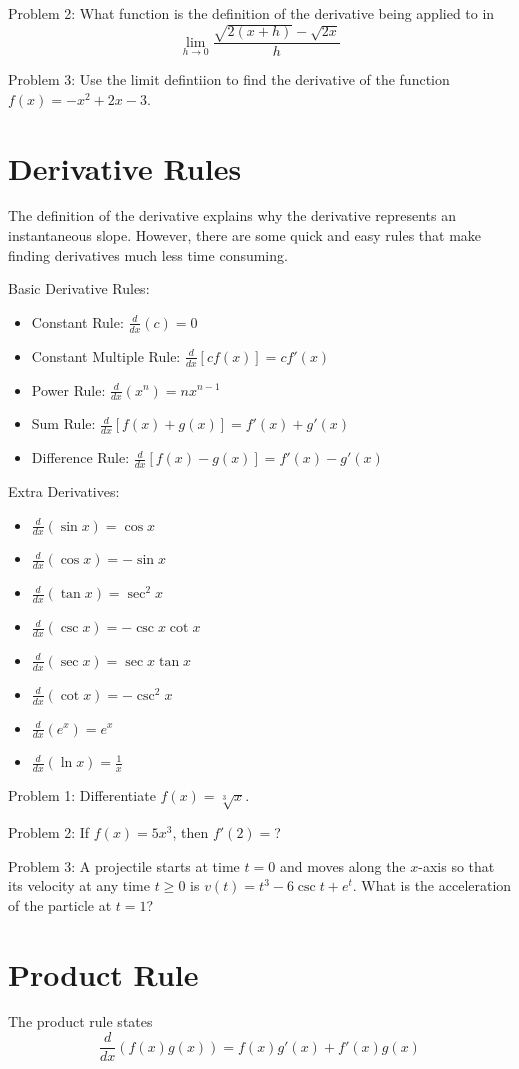 \documentclass[../abcalc.tex]{subfiles}
\begin{document}
Problem 2: What function is the definition of the derivative being applied to in 
\[\lim_{h\to 0} \frac{\sqrt{2(x+h)}-\sqrt{2x}}{h}\] 

Problem 3: Use the limit defintiion to find the derivative of the function $f(x)=-x^2+2x-3$.
\section{Derivative Rules}
The definition of the derivative explains why the derivative represents an instantaneous slope. However, there are some quick and easy rules that make finding derivatives much less time consuming.

Basic Derivative Rules:
\begin{itemize}
    \item Constant Rule: $\frac{d}{dx}(c) = 0$
    \item Constant Multiple Rule: $\frac{d}{dx}[cf(x)] = cf'(x)$
    \item Power Rule: $\frac{d}{dx}(x^n)=nx^{n-1}$
    \item Sum Rule: $\frac{d}{dx}[f(x)+g(x)]=f'(x)+g'(x)$
    \item Difference Rule: $\frac{d}{dx}[f(x)-g(x)]=f'(x)-g'(x)$
\end{itemize}

Extra Derivatives:
\begin{itemize}
    \item $\frac{d}{dx}(\sin x)=\cos x$
    \item $\frac{d}{dx}(\cos x)=-\sin x$
    \item $\frac{d}{dx}(\tan x)=\sec^2 x$
    \item $\frac{d}{dx}(\csc x)=-\csc x\cot x$
    \item $\frac{d}{dx}(\sec x)=\sec x\tan x$
    \item $\frac{d}{dx}(\cot x)=-\csc^2 x$
    \item $\frac{d}{dx}(e^x)=e^x$
    \item $\frac{d}{dx}(\ln x)=\frac{1}{x}$
\end{itemize}

Problem 1: Differentiate $f(x)=\sqrt[3]{x}$.

Problem 2: If $f(x)=5x^3$, then $f'(2)=$?

Problem 3: A projectile starts at time $t=0$ and moves along the $x$-axis so that its velocity at any time $t\geq 0$ is $v(t)=t^3-6\csc t+e^t$.
What is the acceleration of the particle at $t=1$?
\section{Product Rule}
The product rule states 
\[\frac{d}{dx}(f(x)g(x))=f(x)g'(x)+f'(x)g(x)\]
\end{document}
